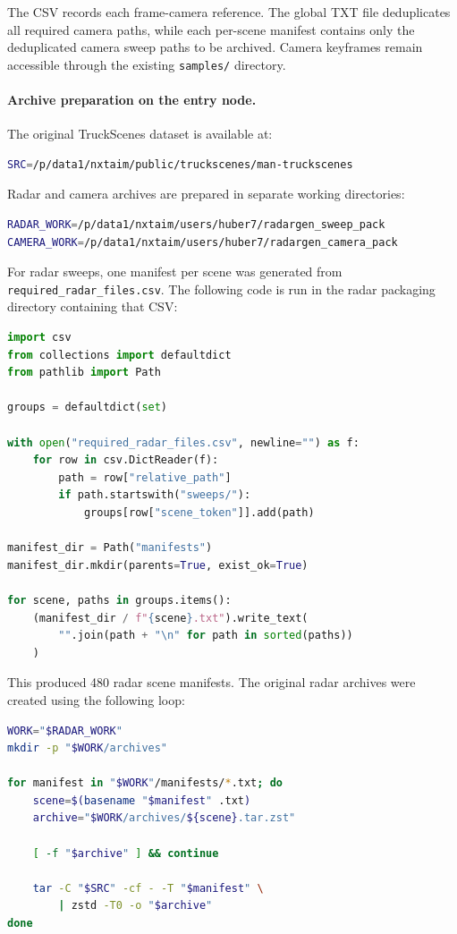 \documentclass[11pt,a4paper]{article}
\begin{document}
The CSV records each frame-camera reference. The global TXT file
deduplicates all required camera paths, while each per-scene manifest
contains only the deduplicated camera sweep paths to be archived.
Camera keyframes remain accessible through the existing
\texttt{samples/} directory.

\paragraph{Archive preparation on the entry node.}

The original TruckScenes dataset is available at:
\begin{lstlisting}[language=bash]
SRC=/p/data1/nxtaim/public/truckscenes/man-truckscenes
\end{lstlisting}

Radar and camera archives are prepared in separate working
directories:
\begin{lstlisting}[language=bash]
RADAR_WORK=/p/data1/nxtaim/users/huber7/radargen_sweep_pack
CAMERA_WORK=/p/data1/nxtaim/users/huber7/radargen_camera_pack
\end{lstlisting}

For radar sweeps, one manifest per scene was generated from
\texttt{required\_radar\_files.csv}. The following code is run in the
radar packaging directory containing that CSV:
\begin{lstlisting}[language=Python]
import csv
from collections import defaultdict
from pathlib import Path

groups = defaultdict(set)

with open("required_radar_files.csv", newline="") as f:
    for row in csv.DictReader(f):
        path = row["relative_path"]
        if path.startswith("sweeps/"):
            groups[row["scene_token"]].add(path)

manifest_dir = Path("manifests")
manifest_dir.mkdir(parents=True, exist_ok=True)

for scene, paths in groups.items():
    (manifest_dir / f"{scene}.txt").write_text(
        "".join(path + "\n" for path in sorted(paths))
    )
\end{lstlisting}

This produced 480 radar scene manifests. The original radar archives
were created using the following loop:
\begin{lstlisting}[language=bash]
WORK="$RADAR_WORK"
mkdir -p "$WORK/archives"

for manifest in "$WORK"/manifests/*.txt; do
    scene=$(basename "$manifest" .txt)
    archive="$WORK/archives/${scene}.tar.zst"

    [ -f "$archive" ] && continue

    tar -C "$SRC" -cf - -T "$manifest" \
        | zstd -T0 -o "$archive"
done
\end{lstlisting}
\end{document}
